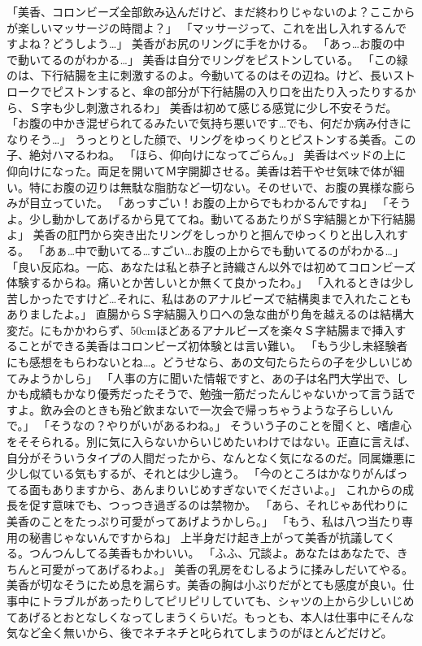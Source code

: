 「美香、コロンビーズ全部飲み込んだけど、まだ終わりじゃないのよ？ここからが楽しいマッサージの時間よ？」
「マッサージって、これを出し入れするんですよね？どうしよう…」
美香がお尻のリングに手をかける。
「あっ…お腹の中で動いてるのがわかる…」
美香は自分でリングをピストンしている。
「この緑のは、下行結腸を主に刺激するのよ。今動いてるのはその辺ね。けど、長いストロークでピストンすると、傘の部分が下行結腸の入り口を出たり入ったりするから、Ｓ字も少し刺激されるわ」
美香は初めて感じる感覚に少し不安そうだ。
「お腹の中かき混ぜられてるみたいで気持ち悪いです…でも、何だか病み付きになりそう…」
うっとりとした顔で、リングをゆっくりとピストンする美香。この子、絶対ハマるわね。
「ほら、仰向けになってごらん。」
美香はベッドの上に仰向けになった。両足を開いてＭ字開脚させる。美香は若干やせ気味で体が細い。特にお腹の辺りは無駄な脂肪など一切ない。そのせいで、お腹の異様な膨らみが目立っていた。
「あっすごい！お腹の上からでもわかるんですね」
「そうよ。少し動かしてあげるから見ててね。動いてるあたりがＳ字結腸とか下行結腸よ」
美香の肛門から突き出たリングをしっかりと掴んでゆっくりと出し入れする。
「あぁ…中で動いてる…すごい…お腹の上からでも動いてるのがわかる…」
「良い反応ね。一応、あなたは私と恭子と詩織さん以外では初めてコロンビーズ体験するからね。痛いとか苦しいとか無くて良かったわ。」
「入れるときは少し苦しかったですけど…それに、私はあのアナルビーズで結構奥まで入れたこともありましたよ。」
直腸からＳ字結腸入り口への急な曲がり角を越えるのは結構大変だ。にもかかわらず、50cmほどあるアナルビーズを楽々Ｓ字結腸まで挿入することができる美香はコロンビーズ初体験とは言い難い。
「もう少し未経験者にも感想をもらわないとね…。どうせなら、あの文句たらたらの子を少しいじめてみようかしら」
「人事の方に聞いた情報ですと、あの子は名門大学出で、しかも成績もかなり優秀だったそうで、勉強一筋だったんじゃないかって言う話ですよ。飲み会のときも殆ど飲まないで一次会で帰っちゃうような子らしいんで。」
「そうなの？やりがいがあるわね。」
そういう子のことを聞くと、嗜虐心をそそられる。別に気に入らないからいじめたいわけではない。正直に言えば、自分がそういうタイプの人間だったから、なんとなく気になるのだ。同属嫌悪に少し似ている気もするが、それとは少し違う。
「今のところはかなりがんばってる面もありますから、あんまりいじめすぎないでくださいよ。」
これからの成長を促す意味でも、つっつき過ぎるのは禁物か。
「あら、それじゃあ代わりに美香のことをたっぷり可愛がってあげようかしら。」
「もう、私は八つ当たり専用の秘書じゃないんですからね」
上半身だけ起き上がって美香が抗議してくる。つんつんしてる美香もかわいい。
「ふふ、冗談よ。あなたはあなたで、きちんと可愛がってあげるわよ。」
美香の乳房をむしるように揉みしだいてやる。美香が切なそうにため息を漏らす。美香の胸は小ぶりだがとても感度が良い。仕事中にトラブルがあったりしてピリピリしていても、シャツの上から少しいじめてあげるとおとなしくなってしまうくらいだ。もっとも、本人は仕事中にそんな気など全く無いから、後でネチネチと叱られてしまうのがほとんどだけど。
